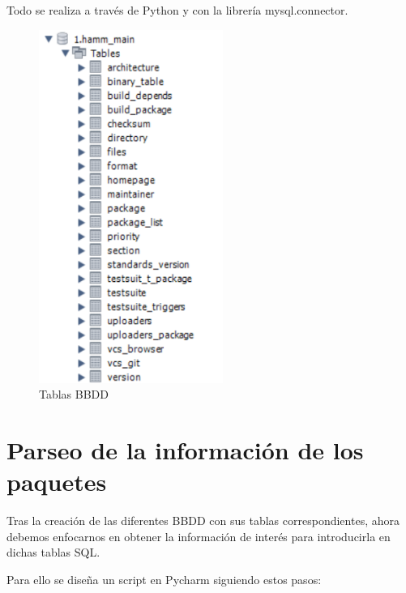 \documentclass[a4paper, 12pt]{book}
\begin{document}
\begin{itemize}
	Todo se realiza a través de Python y con la librería mysql.connector.
	
	\begin{figure}[h]
		\centering
		\includegraphics[width=6cm, keepaspectratio]{img/Tablas.png}
		\caption{Tablas BBDD}
		\label{fig:Tablas}
	\end{figure}

	
\end{itemize}

\section{Parseo de la información de los paquetes} 
\label{sec:parseo}
Tras la creación de las diferentes BBDD con sus tablas correspondientes, ahora debemos enfocarnos en obtener la información de interés para introducirla en dichas tablas SQL.

Para ello se diseña un script en Pycharm siguiendo estos pasos:
\end{document}
